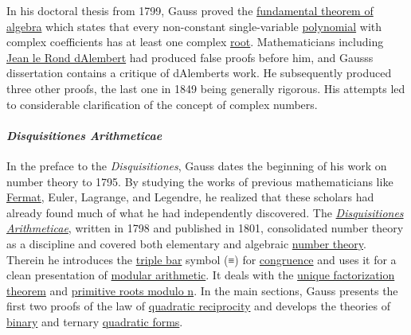 In his doctoral thesis from 1799, Gauss proved the \href{https://en.wikipedia.org/wiki/Fundamental_theorem_of_algebra}{fundamental theorem of algebra} which states that every non-constant single-variable \href{https://en.wikipedia.org/wiki/Polynomial}{polynomial} with complex coefficients has at least one complex \href{https://en.wikipedia.org/wiki/Root_of_a_function}{root}. Mathematicians including \href{https://en.wikipedia.org/wiki/Jean_le_Rond_d'Alembert}{Jean le Rond d\textquotesingle Alembert} had produced false proofs before him, and Gauss\textquotesingle s dissertation contains a critique of d\textquotesingle Alembert\textquotesingle s work. He subsequently produced three other proofs, the last one in 1849 being generally rigorous. His attempts led to considerable clarification of the concept of complex numbers.


\paragraph{\texorpdfstring{\emph{Disquisitiones Arithmeticae}}{Disquisitiones Arithmeticae}}\label{Disquisitiones_Arithmeticae}

In the preface to the \emph{Disquisitiones}, Gauss dates the beginning of his work on number theory to 1795. By studying the works of previous mathematicians like \href{https://en.wikipedia.org/wiki/Pierre_de_Fermat}{Fermat}, Euler, Lagrange, and Legendre, he realized that these scholars had already found much of what he had independently discovered. The \emph{\href{https://en.wikipedia.org/wiki/Disquisitiones_Arithmeticae}{Disquisitiones Arithmeticae}}, written in 1798 and published in 1801, consolidated number theory as a discipline and covered both elementary and algebraic \href{https://en.wikipedia.org/wiki/Number_theory}{number theory}. Therein he introduces the \href{https://en.wikipedia.org/wiki/Triple_bar}{triple bar} symbol ({≡}) for \href{https://en.wikipedia.org/wiki/Congruence_relation}{congruence} and uses it for a clean presentation of \href{https://en.wikipedia.org/wiki/Modular_arithmetic}{modular arithmetic}. It deals with the \href{https://en.wikipedia.org/wiki/Unique_factorization_theorem}{unique factorization theorem} and \href{https://en.wikipedia.org/wiki/Primitive_root_modulo_n}{primitive roots modulo n}. In the main sections, Gauss presents the first two proofs of the law of \href{https://en.wikipedia.org/wiki/Quadratic_reciprocity}{quadratic reciprocity} and develops the theories of \href{https://en.wikipedia.org/wiki/Binary_quadratic_form}{binary} and ternary \href{https://en.wikipedia.org/wiki/Quadratic_form}{quadratic forms}.

